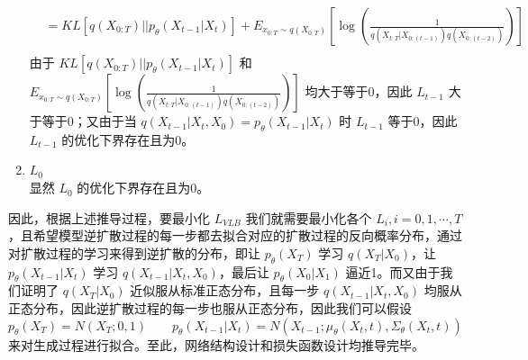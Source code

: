 \documentclass[12pt,a4paper,UTF8]{article}
\begin{document}
\begin{enumerate}
\[\begin{aligned}
&=KL\left[q\left(X_{0:T}\right)||p_{\theta}\left(X_{t-1}|X_t\right)\right]+E_{x_{0:T}\sim q\left(X_{0:T}\right)}\left[\log\left(\frac{1}{q\left(X_{t:T}|X_{0:\left(t-1\right)}\right)q\left(X_{0:\left(t-2\right)}\right)}\right)\right]\\
\end{aligned}\]
由于 $KL\left[q\left(X_{0:T}\right)||p_{\theta}\left(X_{t-1}|X_t\right)\right]$ 和 $E_{x_{0:T}\sim q\left(X_{0:T}\right)}\left[\log\left(\frac{1}{q\left(X_{t:T}|X_{0:\left(t-1\right)}\right)q\left(X_{0:\left(t-2\right)}\right)}\right)\right]$ 均大于等于0，因此 $L_{t-1}$ 大于等于0；又由于当 $q\left(X_{t-1}|X_t,X_0\right)=p_{\theta}\left(X_{t-1}|X_t\right)$ 时 $L_{t-1}$ 等于0，因此 $L_{t-1}$ 的优化下界存在且为0。
\item $L_0$\\
显然 $L_0$ 的优化下界存在且为0。
\end{enumerate}

\indent 因此，根据上述推导过程，要最小化 $L_{VLB}$ 我们就需要最小化各个 $L_i,i=0,1,\cdots,T$，且希望模型逆扩散过程的每一步都去拟合对应的扩散过程的反向概率分布，通过对扩散过程的学习来得到逆扩散的分布，即让 $p_{\theta}\left(X_T\right)$ 学习 $q\left(X_T|X_0\right)$，让 $p_{\theta}\left(X_{t-1}|X_t\right)$ 学习 $q\left(X_{t-1}|X_t,X_0\right)$，最后让 $p_{\theta}\left(X_0|X_1\right)$ 逼近1。而又由于我们证明了 $q\left(X_T|X_0\right)$ 近似服从标准正态分布，且每一步 $q\left(X_{t-1}|X_t,X_0\right)$ 均服从正态分布，因此逆扩散过程的每一步也服从正态分布，因此我们可以假设
\[p_{\theta}\left(X_T\right)=N\left(X_T;0,1\right)\qquad p_{\theta}\left(X_{t-1}|X_t\right)=N\left(X_{t-1};\mu_{\theta}\left(X_t,t\right),\Sigma_{\theta}\left(X_t,t\right)\right)\]
来对生成过程进行拟合。至此，网络结构设计和损失函数设计均推导完毕。
\end{document}
